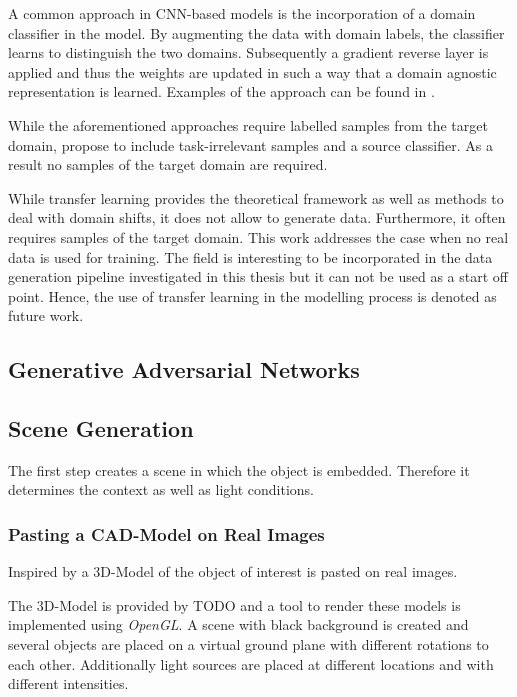 A common approach in \ac{CNN}-based models is the incorporation of a domain classifier in the model. By augmenting the data with domain labels, the classifier learns to distinguish the two domains. Subsequently a gradient reverse layer is applied and thus the weights are updated in such a way that a domain agnostic representation is learned. Examples of the approach can be found in \cite{Chen2018c} \cite{Xu2017}.

While the aforementioned approaches require labelled samples from the target domain, \citeauthor{Peng2017} \cite{Peng2017} propose to include task-irrelevant samples and a source classifier. As a result no samples of the target domain are required.

While transfer learning provides the theoretical framework as well as methods to deal with domain shifts, it does not allow to generate data. Furthermore, it often requires samples of the target domain. This work addresses the case when no real data is used for training. The field is interesting to be incorporated in the data generation pipeline investigated in this thesis but it can not be used as a start off point. Hence, the use of transfer learning in the modelling process is denoted as future work.

\subsection{Generative Adversarial Networks}

\cite{Inoue} 



\subsection{Scene Generation}
\label{sec:training:scene}

The first step creates a scene in which the object is embedded. Therefore it determines the context as well as light conditions.

\subsubsection{Pasting a CAD-Model on Real Images}

Inspired by \cite{Girshick2013, Peng, Rozantsev} a 3D-Model of the object of interest is pasted on real images.

The 3D-Model is provided by  TODO and a tool to render these models is implemented using \textit{OpenGL}. A scene with black background is created and several objects are placed on a virtual ground plane with different rotations to each other. Additionally light sources are placed at different locations and with different intensities. 

